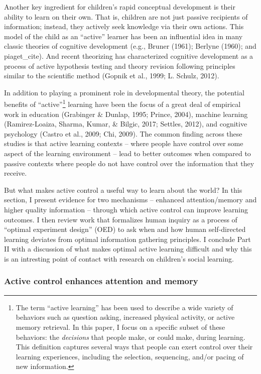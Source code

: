 \documentclass[a4paper,man,apacite,floatsintext]{apa6}
\begin{document}
Another key ingredient for children's rapid conceptual development is
their ability to learn on their own. That is, children are not just
passive recipients of information; instead, they actively seek knowledge
via their own actions. This model of the child as an ``active'' learner
has been an influential idea in many classic theories of cognitive
development (e.g., Bruner (1961); Berlyne (1960); and piaget\_cite). And
recent theorizing has characterized cognitive development as a process
of active hypothesis testing and theory revision following principles
similar to the scientific method (Gopnik et al., 1999; L. Schulz, 2012).

In addition to playing a prominent role in developmental theory, the
potential benefits of ``active''\footnote{The term ``active learning''
  has been used to describe a wide variety of behaviors such as question
  asking, increased physical activity, or active memory retrieval. In
  this paper, I focus on a specific subset of these behaviors: the
  \emph{decisions} that people make, or could make, during learning.
  This definition captures several ways that people can exert control
  over their learning experiences, including the selection, sequencing,
  and/or pacing of new information.} learning have been the focus of a
great deal of empirical work in education (Grabinger \& Dunlap, 1995;
Prince, 2004), machine learning (Ramirez-Loaiza, Sharma, Kumar, \&
Bilgic, 2017; Settles, 2012), and cognitive psychology (Castro et al.,
2009; Chi, 2009). The common finding across these studies is that active
learning contexts -- where people have control over some aspect of the
learning environment -- lead to better outcomes when compared to passive
contexts where people do not have control over the information that they
receive.

But what makes active control a useful way to learn about the world? In
this section, I present evidence for two mechanisms -- enhanced
attention/memory and higher quality information -- through which active
control can improve learning outcomes. I then review work that
formalizes human inquiry as a process of ``optimal experiment design''
(OED) to ask when and how human self-directed learning deviates from
optimal information gathering principles. I conclude Part II with a
discussion of what makes optimal active learning difficult and why this
is an intresting point of contact with research on children's social
learning.

\subsubsection{Active control enhances attention and
memory}\label{active-control-enhances-attention-and-memory}
\end{document}
